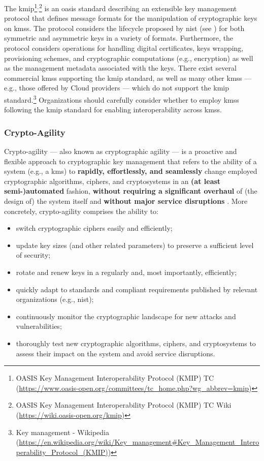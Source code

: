 The \gls{kmip}\footnote{OASIS Key Management Interoperability Protocol (KMIP) TC (\url{https://www.oasis-open.org/committees/tc\_home.php?wg\_abbrev=kmip})}$^,$\footnote{OASIS Key Management Interoperability Protocol (KMIP) TC Wiki (\url{https://wiki.oasis-open.org/kmip})} is an \gls{oasis} standard describing an extensible key management protocol that defines message formats for the manipulation of cryptographic keys on \glspl{kms}. The protocol considers the lifecycle proposed by \gls{nist} (see ) for both symmetric and asymmetric keys in a variety of formats. Furthermore, the protocol considers operations for handling digital certificates, keys wrapping, provisioning schemes, and cryptographic computations (e.g., encryption) as well as the management metadata associated with the keys. There exist several commercial \glspl{kms} supporting the \gls{kmip} standard, as well as many other \glspl{kms} --- e.g., those offered by Cloud providers --- which do not support the \gls{kmip} standard.\footnote{Key management - Wikipedia (\url{https://en.wikipedia.org/wiki/Key\_management\#Key\_Management\_Interoperability\_Protocol\_(KMIP)})} Organizations should carefully consider whether to employ \glspl{kms} following the \gls{kmip} standard for enabling interoperability across \glspl{kms}.



\subsubsection{Crypto-Agility}\label{sec:further:key_management:agility}

Crypto-agility --- also known as cryptographic agility --- is a proactive and flexible approach to cryptographic key management that refers to the ability of a system (e.g., a \gls{kms}) to \textbf{rapidly, effortlessly, and seamlessly} change employed cryptographic algorithms, ciphers, and cryptosystems in an \textbf{(at least semi-)automated} fashion, \textbf{without requiring a significant overhaul} of (the design of) the system itself and \textbf{without major service disruptions} \cite{barker_getting_2021}. More concretely, crypto-agility comprises the ability to:
\begin{itemize}
	\item switch cryptographic ciphers easily and efficiently;
	\item update key sizes (and other related parameters) to preserve a sufficient level of security;
	\item rotate and renew keys in a regularly and, most importantly, efficiently;
	\item quickly adapt to standards and compliant requirements published by relevant organizations (e.g., \gls{nist});
	\item continuously monitor the cryptographic landscape for new attacks and vulnerabilities;
	\item thoroughly test new cryptographic algorithms, ciphers, and cryptosystems to assess their impact on the system and avoid service disruptions.
\end{itemize}

